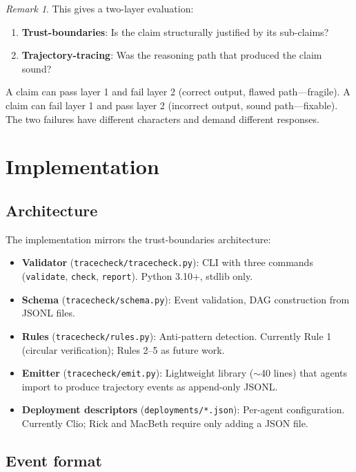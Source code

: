 \documentclass[11pt,a4paper]{article}
\theoremstyle{definition}
\theoremstyle{plain}
\theoremstyle{remark}
\newtheorem{remark}[definition]{Remark}
\begin{document}
\begin{remark}
This gives a two-layer evaluation:
\begin{enumerate}
\item \textbf{Trust-boundaries}: Is the claim structurally justified by its sub-claims?
\item \textbf{Trajectory-tracing}: Was the reasoning path that produced the claim sound?
\end{enumerate}
A claim can pass layer 1 and fail layer 2 (correct output, flawed path---fragile). A claim can fail layer 1 and pass layer 2 (incorrect output, sound path---fixable). The two failures have different characters and demand different responses.
\end{remark}

\section{Implementation}\label{sec:implementation}

\subsection{Architecture}

The implementation mirrors the trust-boundaries architecture:

\begin{itemize}
\item \textbf{Validator} (\texttt{tracecheck/tracecheck.py}): CLI with three commands (\texttt{validate}, \texttt{check}, \texttt{report}). Python 3.10+, stdlib only.
\item \textbf{Schema} (\texttt{tracecheck/schema.py}): Event validation, DAG construction from JSONL files.
\item \textbf{Rules} (\texttt{tracecheck/rules.py}): Anti-pattern detection. Currently Rule 1 (circular verification); Rules 2--5 as future work.
\item \textbf{Emitter} (\texttt{tracecheck/emit.py}): Lightweight library ($\sim$40 lines) that agents import to produce trajectory events as append-only JSONL.
\item \textbf{Deployment descriptors} (\texttt{deployments/*.json}): Per-agent configuration. Currently Clio; Rick and MacBeth require only adding a JSON file.
\end{itemize}

\subsection{Event format}
\end{document}
